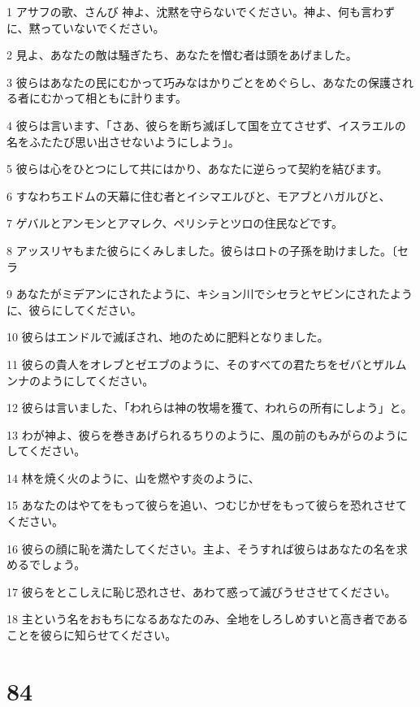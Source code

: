 \par 1 アサフの歌、さんび 神よ、沈黙を守らないでください。神よ、何も言わずに、黙っていないでください。
\par 2 見よ、あなたの敵は騒ぎたち、あなたを憎む者は頭をあげました。
\par 3 彼らはあなたの民にむかって巧みなはかりごとをめぐらし、あなたの保護される者にむかって相ともに計ります。
\par 4 彼らは言います、「さあ、彼らを断ち滅ぼして国を立てさせず、イスラエルの名をふたたび思い出させないようにしよう」。
\par 5 彼らは心をひとつにして共にはかり、あなたに逆らって契約を結びます。
\par 6 すなわちエドムの天幕に住む者とイシマエルびと、モアブとハガルびと、
\par 7 ゲバルとアンモンとアマレク、ペリシテとツロの住民などです。
\par 8 アッスリヤもまた彼らにくみしました。彼らはロトの子孫を助けました。〔セラ
\par 9 あなたがミデアンにされたように、キション川でシセラとヤビンにされたように、彼らにしてください。
\par 10 彼らはエンドルで滅ぼされ、地のために肥料となりました。
\par 11 彼らの貴人をオレブとゼエブのように、そのすべての君たちをゼバとザルムンナのようにしてください。
\par 12 彼らは言いました、「われらは神の牧場を獲て、われらの所有にしよう」と。
\par 13 わが神よ、彼らを巻きあげられるちりのように、風の前のもみがらのようにしてください。
\par 14 林を焼く火のように、山を燃やす炎のように、
\par 15 あなたのはやてをもって彼らを追い、つむじかぜをもって彼らを恐れさせてください。
\par 16 彼らの顔に恥を満たしてください。主よ、そうすれば彼らはあなたの名を求めるでしょう。
\par 17 彼らをとこしえに恥じ恐れさせ、あわて惑って滅びうせさせてください。
\par 18 主という名をおもちになるあなたのみ、全地をしろしめすいと高き者であることを彼らに知らせてください。

\chapter{84}

